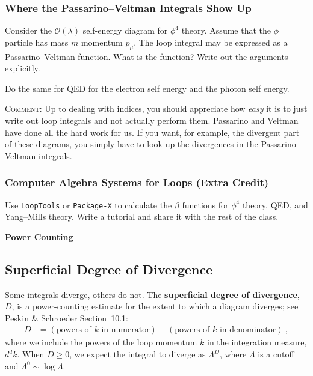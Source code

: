 \documentclass[12pt]{article}
\numberwithin{equation}{subsection}    %
\begin{document}
\subsubsection{Where the Passarino--Veltman Integrals Show Up}

Consider the $\mathcal O(\lambda)$ self-energy diagram for $\phi^4$ theory. Assume that the $\phi$ particle has mass $m$ momentum $p_\mu$. The loop integral may be expressed as a Passarino--Veltman function. What is the function? Write out the arguments explicitly.

Do the same for QED for the electron self energy and the photon self energy.

\textsc{Comment}: Up to dealing with indices, you should appreciate how \emph{easy} it is to just write out loop integrals and not actually perform them. Passarino and Veltman have done all the hard work for us. If you want, for example, the divergent part of these diagrams, you simply have to look up the divergences in the Passarino--Veltman integrals. 




\subsubsection{Computer Algebra Systems for Loops (Extra Credit)}

Use \texttt{LoopTools} or \texttt{Package-X} to calculate the $\beta$ functions for $\phi^4$ theory, QED, and Yang--Mills theory. Write a tutorial and share it with the rest of the class. 

\vspace{1em}
{\Large \bf \sffamily Power Counting}

\subsection{Superficial Degree of Divergence}

Some integrals diverge, others do not. The \textbf{superficial degree of divergence}, $D$, is a power-counting estimate for the extent to which a diagram diverges; see Peskin \& Schroeder Section~10.1:
\begin{align}
	D 
	&= 
	\left(\text{powers of $k$ in numerator}\right)
	-
	\left(\text{powers of $k$ in denominator}\right) \ ,
\end{align}
where we include the powers of the loop momentum $k$ in the integration measure, $d^dk$. 
%
When $D\geq 0$, we expect the integral to diverge as $\Lambda^D$, where $\Lambda$ is a cutoff and $\Lambda^0 \sim \log\Lambda$. 
\end{document}
